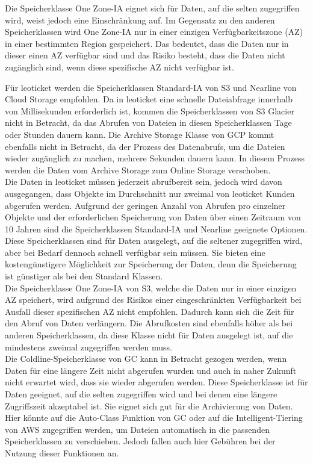 Die Speicherklasse One Zone-IA eignet sich für Daten, auf die selten zugegriffen wird, weist jedoch eine Einschränkung auf. Im Gegensatz zu den anderen Speicherklassen wird One Zone-IA nur in einer einzigen Verfügbarkeitszone (AZ) in einer bestimmten Region gespeichert. Das bedeutet, dass die Daten nur in dieser einen AZ verfügbar sind und das Risiko besteht, dass die Daten nicht zugänglich sind, wenn diese spezifische AZ nicht verfügbar ist.

\newpage

Für leoticket werden die Speicherklassen Standard-IA von S3 und Nearline von Cloud Storage empfohlen. Da in leoticket eine schnelle Dateiabfrage innerhalb von Millisekunden erforderlich ist, kommen die Speicherklassen von S3 Glacier nicht in Betracht, da das Abrufen von Dateien in diesen Speicherklassen Tage oder Stunden dauern kann. Die Archive Storage Klasse von GCP kommt ebenfalls nicht in Betracht, da der Prozess des Datenabrufs, um die Dateien wieder zugänglich zu machen, mehrere Sekunden dauern kann. In diesem Prozess werden die Daten vom Archive Storage zum Online Storage verschoben.\\ 

Die Daten in leoticket müssen jederzeit abrufbereit sein, jedoch wird davon ausgegangen, dass Objekte im Durchschnitt nur zweimal von leoticket Kunden abgerufen werden. Aufgrund der geringen Anzahl von Abrufen pro einzelner Objekte und der erforderlichen Speicherung von Daten über einen Zeitraum von 10 Jahren sind die Speicherklassen Standard-IA und Nearline geeignete Optionen. Diese Speicherklassen sind für Daten ausgelegt, auf die seltener zugegriffen wird, aber bei Bedarf dennoch schnell verfügbar sein müssen. Sie bieten eine kostengünstigere Möglichkeit zur Speicherung der Daten, denn die Speicherung ist günstiger als bei den Standard Klassen.\\ 

Die Speicherklasse One Zone-IA von S3, welche die Daten nur in einer einzigen AZ speichert, wird aufgrund des Risikos einer eingeschränkten Verfügbarkeit bei Ausfall dieser spezifischen AZ nicht empfohlen. Dadurch kann sich die Zeit für den Abruf von Daten verlängern. Die Abrufkosten sind ebenfalls höher als bei anderen Speicherklassen, da diese Klasse nicht für Daten ausgelegt ist, auf die mindestens zweimal zugegriffen werden muss.\\ 

Die Coldline-Speicherklasse von GC kann in Betracht gezogen werden, wenn Daten für eine längere Zeit nicht abgerufen wurden und auch in naher Zukunft nicht erwartet wird, dass sie wieder abgerufen werden. Diese Speicherklasse ist für Daten geeignet, auf die selten zugegriffen wird und bei denen eine längere Zugriffszeit akzeptabel ist. Sie eignet sich gut für die Archivierung von Daten. Hier könnte auf die Auto-Class Funktion von GC oder auf die Intelligent-Tiering von AWS zugegriffen werden, um Dateien automatisch in die passenden Speicherklassen zu verschieben. Jedoch fallen auch hier Gebühren bei der Nutzung dieser Funktionen an.\\


